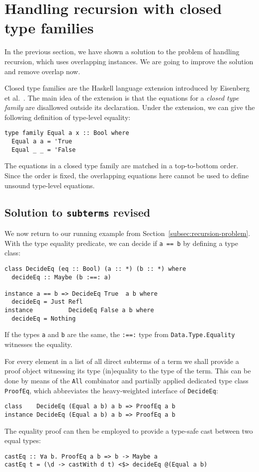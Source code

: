 \documentclass[runningheads]{llncs}
\newcommand{\K}[1]{\lstinline{#1}}
\begin{document}
\section{Handling recursion with closed type families}
\label{sec:handling-recursion}


In the previous section, we have shown a solution to the problem of handling recursion, which uses overlapping instances. We are going to improve the solution and remove overlap now.

Closed type families are the Haskell language extension introduced by Eisenberg et al.~\cite{Eisenberg2014}. The main idea of the extension is that the equations for a \emph{closed type family} are disallowed outside its declaration. Under the extension, we can give the following definition of type-level equality:
\begin{lstlisting}
type family Equal a x :: Bool where
  Equal a a = 'True
  Equal _ _ = 'False
\end{lstlisting}
The equations in a closed type family are matched in a top-to-bottom order. Since the order is fixed, the overlapping equations here cannot be used to define unsound type-level equations.

\subsection{Solution to \K{subterms} revised}
\label{subsec:solve-subterms}

We now return to our running example from Section~\ref{subsec:recursion-problem}. With the type equality predicate, we can decide if \K{a == b} by defining a type class:
\begin{lstlisting}
class DecideEq (eq :: Bool) (a :: *) (b :: *) where
  decideEq :: Maybe (b :==: a)

instance a == b => DecideEq True  a b where
  decideEq = Just Refl
instance          DecideEq False a b where
  decideEq = Nothing
\end{lstlisting}
If the types \K{a} and \K{b} are the same, the \K{:==:} type from \K{Data.Type.Equality} witnesses the equality.

For every element in a list of all direct subterms of a term we shall provide a proof object witnessing its type (in)equality to the type of the term. This can be done by means of the \K{All} combinator and partially applied dedicated type class \K{ProofEq}, which abbreviates the heavy-weighted interface of \K{DecideEq}:
\begin{lstlisting}
class    DecideEq (Equal a b) a b => ProofEq a b
instance DecideEq (Equal a b) a b => ProofEq a b
\end{lstlisting}
The equality proof can then be employed to provide a type-safe cast between two equal types:
\begin{lstlisting}
castEq :: ∀a b. ProofEq a b => b -> Maybe a
castEq t = (\d -> castWith d t) <$> decideEq @(Equal a b)
\end{lstlisting}
\end{document}
